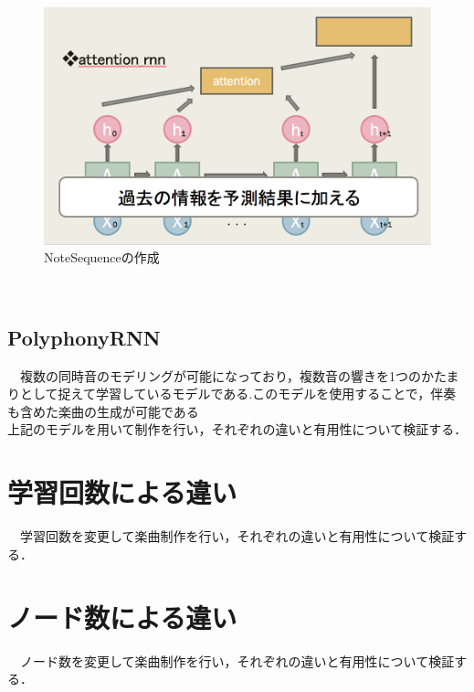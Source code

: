 \begin{figure}[!ht]
    \begin{screen}
    \begin{center}
        \includegraphics[scale=0.8, clip]{./img/attention1.png}
        \caption{NoteSequenceの作成}
        \label{fig:NoteSequenceの作成}
    \end{center}
    \end{screen}
\end{figure}\\
\subsection{PolyphonyRNN}
　複数の同時音のモデリングが可能になっており，複数音の響きを1つのかたまりとして捉えて学習しているモデルである.このモデルを使用することで，伴奏も含めた楽曲の生成が可能である\\
上記のモデルを用いて制作を行い，それぞれの違いと有用性について検証する．
\section{学習回数による違い}
　学習回数を変更して楽曲制作を行い，それぞれの違いと有用性について検証する．
\section{ノード数による違い}
　ノード数を変更して楽曲制作を行い，それぞれの違いと有用性について検証する．